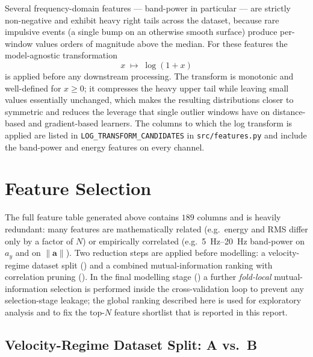 Several frequency-domain features --- band-power in particular --- are strictly non-negative and exhibit heavy right tails across the dataset, because rare impulsive events (a single bump on an otherwise smooth surface) produce per-window values orders of magnitude above the median. For these features the model-agnostic transformation
\begin{equation}
    x \;\mapsto\; \log(1 + x)
    \label{eq:log1p}
\end{equation}
is applied before any downstream processing. The transform is monotonic and well-defined for $x \ge 0$; it compresses the heavy upper tail while leaving small values essentially unchanged, which makes the resulting distributions closer to symmetric and reduces the leverage that single outlier windows have on distance-based and gradient-based learners. The columns to which the log transform is applied are listed in \texttt{LOG\_TRANSFORM\_CANDIDATES} in \texttt{src/features.py} and include the band-power and energy features on every channel.

\section{Feature Selection}
\label{sec:feat_selection}

The full feature table generated above contains $189$ columns and is heavily redundant: many features are mathematically related (e.g.\ energy and RMS differ only by a factor of $N$) or empirically correlated (e.g.\ \SIrange{5}{20}{\hertz} band-power on $a_y$ and on $\lVert\mathbf{a}\rVert$). Two reduction steps are applied before modelling: a velocity-regime dataset split () and a combined mutual-information ranking with correlation pruning (). In the final modelling stage () a further \emph{fold-local} mutual-information selection is performed inside the cross-validation loop to prevent any selection-stage leakage; the global ranking described here is used for exploratory analysis and to fix the top-$N$ feature shortlist that is reported in this report.

\subsection{Velocity-Regime Dataset Split: A vs.\ B}
\label{sec:feat_dataset_AB}

